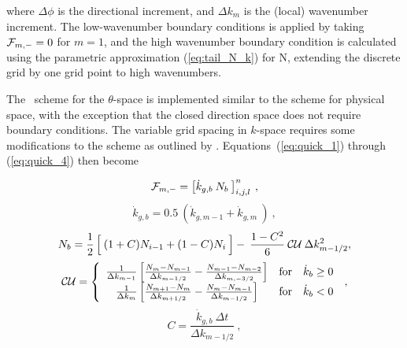 \noindent
where $\Delta \phi$ is the directional increment, and $\Delta k_m$ is the
(local) wavenumber increment. The low-wavenumber boundary conditions is
applied by taking ${\cal F}_{m,-}=0$ for $m=1$, and the high wavenumber boundary
condition is calculated using the parametric approximation (\ref{eq:tail_N_k})
for N, extending the discrete grid by one grid point to high wavenumbers.

\vspace{\baselineskip} \noindent
The \uq\ scheme for the $\theta$-space is implemented similar to the scheme
for physical space, with the exception that the closed direction space does
not require boundary conditions. The variable grid spacing in $k$-space
requires some modifications to the scheme as outlined by
\cite[{Appendix}]{art:Leo79}. Equations~(\ref{eq:quick_1}) through
(\ref{eq:quick_4}) then become


\begin{equation}
{\cal F}_{m,-} = \left [ \dot{k}_{g,b} \: N_b \: \right ]^n_{i,j,l}
\: , \label{eq:quick_1k}\end{equation} \begin{equation}
\dot{k}_{g,b} = 0.5 \: \left ( \dot{k}_{g,m-1} + \dot{k}_{g,m} 
\: \right )  \: , \label{eq:quick_1ak}
\end{equation} \begin{equation}
N_b = \frac{1}{2} \left [ \rule[0mm]{0mm}{\baselineskip} \: 
(1+C)N_{i-1} + (1-C)N_i \: \right ] - \:
\frac{1-C^2}{6} \: {\cal CU} \: \Delta k^2_{m-1/2}, \label{eq:quick_2k} \end{equation} \begin{equation}
{\cal CU} =  \left \{ \begin{array}{ccc}
\frac{1}{\Delta k_{m-1}}
\left [ \frac{N_{ m }-N_{m-1}}{\Delta k_{m-1/2}} - 
        \frac{N_{m-1}-N_{m-2}}{\Delta k_{m,-3/2}} \right ]
               & \mbox{for} & \dot{k}_b \geq 0 \\
\frac{1}{\Delta k_m}
\left [ \frac{N_{m+1}-N_{ m }}{\Delta k_{m+1/2}} -
       \frac{N_{ m }-N_{m-1}}{\Delta k_{m-1/2}} \right ]
               & \mbox{for} & \dot{k}_b   <  0
\end{array} \right . \: , \label{eq:quick_3k}
\end{equation} \begin{equation}
C = \frac{\dot{k}_{g,b} \: \Delta t}{\Delta k_{m-1/2}}
\: , \label{eq:quick_4k} \end{equation}

